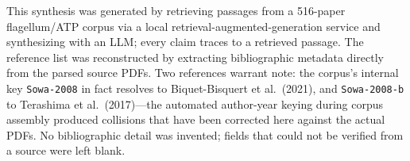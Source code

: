 \documentclass[11pt,letterpaper]{article}
\begin{document}
\begin{caveatbox}
This synthesis was generated by retrieving passages from a 516-paper flagellum/ATP corpus via a local
retrieval-augmented-generation service and synthesizing with an LLM; every claim traces to a retrieved
passage. The reference list was reconstructed by extracting bibliographic metadata directly from the
parsed source PDFs. Two references warrant note: the corpus's internal key \texttt{Sowa-2008} in fact
resolves to Biquet-Bisquert et al.\ (2021), and \texttt{Sowa-2008-b} to Terashima et al.\ (2017)---the
automated author-year keying during corpus assembly produced collisions that have been corrected here
against the actual PDFs. No bibliographic detail was invented; fields that could not be verified from a
source were left blank.
\end{caveatbox}
\end{document}
